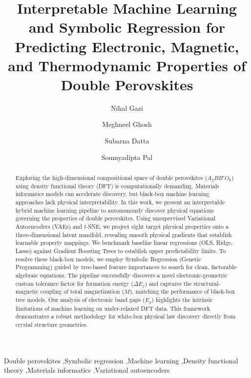 \documentclass[12pt,onecolumn]{elsarticle}
\begin{document}
\begin{frontmatter}

\title{Interpretable Machine Learning and Symbolic Regression for Predicting Electronic, Magnetic, and Thermodynamic Properties of Double Perovskites}

\author{Nihal Gazi}
\author{Meghneel Ghosh}
\author{Subarna Datta}
\author{Soumyadipta Pal}

\address{Institute of Engineering \& Management, Management House, D-1, Sector-V, Saltlake Electronics Complex, Kolkata-700091, India}
\address{University of Engineering and Management, New Town, University Area, Plot No. III, B/5, New Town Rd, Action Area III, Newtown, Kolkata-700160,India}


\begin{abstract}
Exploring the high-dimensional compositional space of double perovskites ($A_2BB'O_6$) using density functional theory (DFT) is computationally demanding. Materials informatics models can accelerate discovery, but black-box machine learning approaches lack physical interpretability. In this work, we present an interpretable hybrid machine learning pipeline to autonomously discover physical equations governing the properties of double perovskites. Using unsupervised Variational Autoencoders (VAEs) and $t$-SNE, we project eight target physical properties onto a three-dimensional latent manifold, revealing smooth physical gradients that establish learnable property mappings. We benchmark baseline linear regressions (OLS, Ridge, Lasso) against Gradient Boosting Trees to establish upper predictability limits. To resolve these black-box models, we employ Symbolic Regression (Genetic Programming) guided by tree-based feature importances to search for clean, factorable algebraic equations. The pipeline successfully discovers a novel electronic-geometric custom tolerance factor for formation energy ($\Delta E_f$) and captures the structural-magnetic coupling of total magnetization ($M$), matching the performance of black-box tree models. Our analysis of electronic band gaps ($E_g$) highlights the intrinsic limitations of machine learning on under-relaxed DFT data. This framework demonstrates a robust methodology for white-box physical law discovery directly from crystal structure geometries.
\end{abstract}

\begin{keyword}
Double perovskites \sep Symbolic regression \sep Machine learning \sep Density functional theory \sep Materials informatics \sep Variational autoencoders
\end{keyword}

\end{frontmatter}
\end{document}
